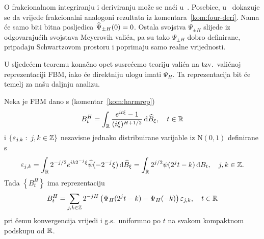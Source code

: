 \documentclass[main.tex]{subfiles}
\begin{document}
\begin{komentar}\label{kom:Psi}
	O frakcionalnom integriranju i deriviranju može se naći u~\cite{fidta}.
	Posebice, u~\cite[]{fidta} dokazuje se da vrijede frakcionalni analogoni
	rezultata iz komentara~\ref{kom:four-deri}. Nama će samo biti bitna
	posljedica \( \widehat{\Psi}_{\pm H}(0)=0 \).
	Ostala svojstva \( \Psi_{\pm H} \) slijede iz odgovarajućih svojstava Meyerovih valića, pa
	su tako \( \Psi_{\pm H} \) dobro definirane, pripadaju Schwartzovom prostoru
	i poprimaju samo realne vrijednosti.
\end{komentar}

U sljedećem teoremu konačno opet susrećemo teoriju valića na tzv.\ valićnoj
reprezentaciji FBM, iako će direktniju ulogu imati \( \Psi_H \).
Ta reprezentacija bit će temelj za našu daljnju analizu.

\begin{teorem}\label{holpo-teorem1}
	Neka je FBM dano s (komentar~\ref{kom:harmrep})
	\begin{equation}
		B^H_t = \int_{\mathbb{R}} \frac{e^{it\xi}-1}{(i\xi)^{H+1/2}} \,\mathrm d \widehat{B}_\xi, \quad t \in \mathbb{R}
	\end{equation}
	i
	\( \left\{ \varepsilon_{j,k} \, \colon \, j,k \in \mathbb{Z} \right\} \)
	nezavisne jednako distribuirane varijable iz \( \mathrm N(0,1) \) definirane s
	\begin{equation}\label{eq:defepsjk}
		\varepsilon_{j,k} =
		\int_{\mathbb{R}} 2^{-j/2}e^{ik2^{-j}\xi}\widehat{\psi}(-2^{-j}\xi)\,\mathrm d \widehat{B}_\xi =
		\int_{\mathbb{R}} 2^{j/2} \psi(2^jt-k) \,\mathrm d B_t, \quad j,k\in \mathbb{Z}.
	\end{equation}
	Tada \( \left\{ B^H_t  \right\} \) ima reprezentaciju
	\begin{equation}\label{eq:valfbmrep}
		B^H_t = \sum_{j,k \in \mathbb{Z}}
		2^{-jH} \left( \Psi_H(2^jt - k) - \Psi_H(-k)  \right) \varepsilon_{j,k}, \quad t \in \mathbb{R}
	\end{equation}
	pri čemu konvergencija vrijedi i g.s.\ uniformno po \( t \) na svakom
	kompaktnom podskupu od \( \mathbb{R} \).
\end{teorem}
\end{document}
